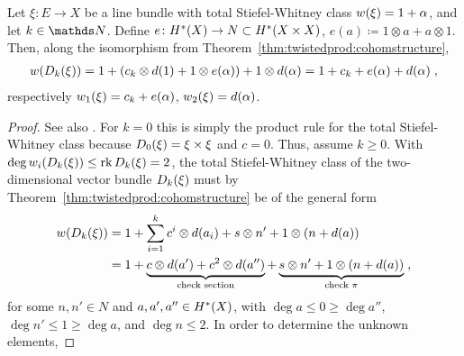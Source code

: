 \begin{Cor}\label{cor:twistedprod:swlinebdl}
  Let $\xi\colon E\to X$ be a line bundle with total Stiefel-Whitney
  class ${w}(\xi)=1+\alpha$, and let $k\in\Nat$.
  Define $e\colon H^*(X)\to N\subset H^*(X\times X)$,
  $e(a)\coloneqq 1\otimes a+a\otimes 1$.
  Then, along the isomorphism from
  Theorem~\ref{thm:twistedprod:cohomstructure},
  \begin{gather*}
    {w}(D_{k}({\xi})) = 1+ (c_k\otimes d(1)+1\otimes
    e(\alpha)) + 1\otimes d(\alpha)
    = 1+c_k+e(\alpha)+d(\alpha)
    \;,
  \end{gather*}
  respectively ${w_{1}}(\xi) = c_k+e(\alpha)$, ${w_{2}}(\xi)=d(\alpha)$.
  \begin{proof}
    See also \cite[Prop.~7.4, p.~1113]{brown}.
    For $k=0$ this is simply the product rule for the total
    Stiefel-Whitney class because $D_{0}({\xi})=\xi\times\xi$
    and $c=0$. Thus, assume $k\geq0$.
    With $\deg{w_{i}}(D_{k}({\xi}))\leq\operatorname{rk}D_{k}({\xi})=2$,
    the total Stiefel-Whitney class of the two-dimensional vector bundle
    $D_{k}({\xi})$ must by
    Theorem~\ref{thm:twistedprod:cohomstructure} be of the general
    form
    \begin{align*}
      \W{\Twistedprod{k}{\xi}}
      &= 1
        + \sum_{i=1}^k c^i\otimes d(a_i)
        + s\otimes n'
        + 1\otimes(n+d(a))
         \\
      &\equalsby{}
        1
        + \underbrace{
        c\otimes d(a') + c^2\otimes d(a'')
        }_{\text{check section}}
        + \underbrace{
        s\otimes n'
        + 1\otimes(n+d(a))
        }_{\text{check $\pi$}}
        \;,
    \end{align*}
    for some $n,n'\in N$ and $a,a',a''\in H^*(X)$,
    with $\deg a\leq 0\geq\deg a''$, $\deg n'\leq1\geq\deg a$, and
    $\deg n\leq 2$.
    In order to determine the unknown elements,

\end{proof}
\end{Cor}
